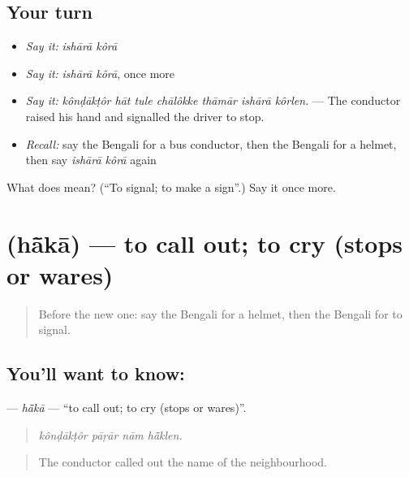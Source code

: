 \subsection*{Your turn}
\begin{itemize}
\raggedright
  \item \emph{Say it:} \emph{ishārā kôrā}
  \item \emph{Say it:} \emph{ishārā kôrā}, once more
  \item \emph{Say it:} \emph{kônḍākṭôr hāt tule chālôkke thāmār ishārā kôrlen.} — The conductor raised his hand and signalled the driver to stop.
  \item \emph{Recall:} say the Bengali for a bus conductor, then the Bengali for a helmet, then say \emph{ishārā kôrā} again
\end{itemize}

\begin{tcolorbox}[breakable,colback=teal!4,colframe=teal!35!black,title={Before you move on}]
What does   mean? (\textquotedblleft{}To signal; to make a sign\textquotedblright{}.) Say it once more.
\end{tcolorbox}
\section[\texorpdfstring{\bn{হাঁকা} (hā̃kā)}{হাঁকা (hā̃kā)}]{ (hā̃kā) — to call out; to cry (stops or wares)}

\label{lesson:BN-C389-haka}



\begin{quote}
Before the new one: say the Bengali for a helmet, then the Bengali for to signal.
\end{quote}

\subsection*{You'll want to know: }
\textbf{} — \emph{hā̃kā} — \textquotedblleft{}to call out; to cry (stops or wares)\textquotedblright{}.

\begin{quote}
   
\end{quote}

\begin{quote}
\emph{kônḍākṭôr pāṛār nām hā̃klen.}
\end{quote}

\begin{quote}
The conductor called out the name of the neighbourhood.
\end{quote}

